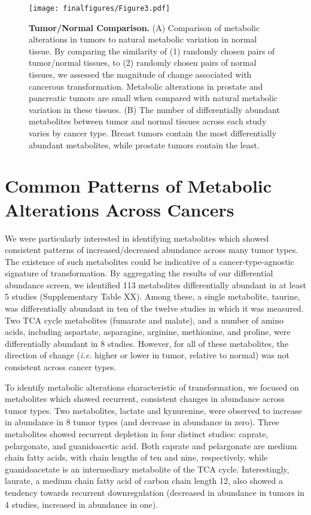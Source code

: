 \documentclass[10pt]{article}
\begin{document}
\begin{figure}[ht!]
  \centering
     \texttt{[image: finalfigures/Figure3.pdf]}
  \caption{\textbf{Tumor/Normal Comparison.} (A) Comparison of metabolic alterations in tumors to natural metabolic variation in normal tissue. By comparing the similarity of (1) randomly chosen pairs of tumor/normal tissues, to (2) randomly chosen pairs of normal tissues, we assessed the magnitude of change associated with cancerous transformation. Metabolic alterations in prostate and pancreatic tumors are small when compared with natural metabolic variation in these tissues. (B) The number of differentially abundant metabolites between tumor and normal tissues across each study varies by cancer type. Breast tumors contain the most differentially abundant metabolites, while prostate tumors contain the least. }
     \label{fig:Fig3}
\end{figure}

\section{ Common Patterns of Metabolic Alterations Across Cancers}
We were particularly interested in identifying metabolites which showed consistent patterns of increased/decreased abundance across many tumor types. The existence of such metabolites could be indicative of a cancer-type-agnostic signature of transformation. By aggregating the results of our differential abundance screen, we identified 113 metabolites differentially abundant in at least 5 studies (Supplementary Table XX). Among these, a single metabolite, taurine, was differentially abundant in ten of the twelve studies in which it was measured. Two TCA cycle metabolites (fumarate and malate), and a number of amino acids, including aspartate, asparagine, arginine, methionine, and proline, were differentially abundant in 8 studies. However, for all of these metabolites, the direction of change (\textit{i.e.} higher or lower in tumor, relative to normal) was not consistent across cancer types.

To identify metabolic alterations characteristic of transformation, we focused on metabolites which showed recurrent, consistent changes in abundance across tumor types. Two metabolites, lactate and kynurenine, were observed to increase in abundance in 8 tumor types (and decrease in abundance in zero). Three metabolites showed recurrent depletion in four distinct studies: caprate, pelargonate, and guanidoacetic acid. Both caprate and pelargonate are medium chain fatty acids, with chain lengths of ten and nine, respectively, while guanidoacetate is an intermediary metabolite of the TCA cycle. Interestingly, laurate, a medium chain fatty acid of carbon chain length 12, also showed a tendency towards recurrent downregulation (decreased in abundance in tumors in 4 studies, increased in abundance in one). 
\end{document}
